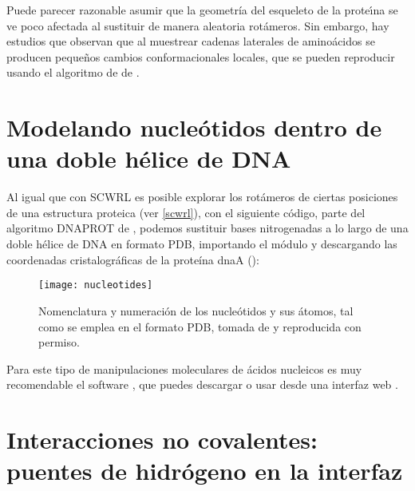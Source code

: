 Puede parecer razonable asumir que la geometr\'{i}a del esqueleto de la prote\'\i{}na se ve poco afectada al sustituir de manera 
aleatoria rot\'{a}meros. Sin embargo, hay estudios que observan que al muestrear cadenas laterales de 
amino\'{a}cidos se producen peque\~nos cambios conformacionales locales, que se pueden reproducir 
usando el algoritmo de  de \citet{Davis2006}.


\section{Modelando nucle\'{o}tidos dentro de una doble h\'{e}lice de DNA} \label{modelnt}

Al igual que con SCWRL es posible explorar los rot\'{a}meros de ciertas posiciones de una estructura proteica (ver \ref{scwrl}), 
con el siguiente c\'{o}digo, parte del algoritmo DNAPROT de \citet{Espinosa2008}, 
podemos sustituir bases nitrogenadas a lo largo 
de una doble h\'{e}lice de DNA en formato PDB, importando el m\'{o}dulo  y descargando
las coordenadas cristalogr\'{a}ficas de la prote\'{i}na dnaA ():

\begin{figure}
\begin{center} 
\texttt{[image: nucleotides]}
\caption%
{
Nomenclatura y numeraci\'{o}n de los nucle\'{o}tidos y sus \'{a}tomos, tal como se emplea en el formato PDB,
tomada de  y reproducida con permiso.
}
\label{fig:nucleotides}
\end{center}
\end{figure}



Para este tipo de manipulaciones moleculares de \'{a}cidos nucleicos es muy recomendable el software 
, que puedes descargar o usar desde una interfaz web \citep{Lu2008}.


\section{Interacciones no covalentes: puentes de hidr\'{o}geno en la interfaz} \label{Hbonds}

